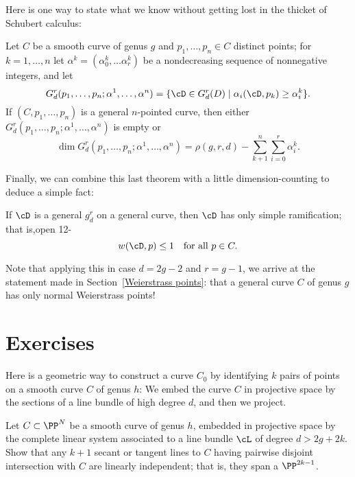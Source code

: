 Here is one way to state what we know without getting lost in the thicket of Schubert calculus:

\begin{theorem}\label{BN with inflection and dimension}
Let $C$ be a smooth curve of genus $g$ and $p_1,\dots,p_n \in C$ distinct points; for $k = 1,\dots,n$ let $\alpha^k = (\alpha^k_0,\dots\alpha^k_r)$ be a nondecreasing sequence of nonnegative integers, and let
$$
G^r_d(p_1,\dots,p_n; \alpha^1,\dots,\alpha^n) = \{\cD \in G^r_d(D) \mid \alpha_i(\cD, p_k) \geq \alpha^k_i \}.
$$
If $(C, p_1,\dots,p_n)$ is a general $n$-pointed curve, then either $G^r_d(p_1,\dots,p_n; \alpha^1,\dots,\alpha^n)$ is empty or
$$
\dim G^r_d(p_1,\dots,p_n; \alpha^1,\dots,\alpha^n) = \rho(g,r,d) - \sum_{k+1}^n \sum_{i=0}^r \alpha^k_i.
$$
\end{theorem}

Finally, we can combine this last theorem with a little dimension-counting to deduce a simple fact:

\begin{theorem}
If $\cD$ is a general $g^r_d$ on a general curve, then $\cD$ has only simple ramification; that is,open 12-	
$$
w(\cD, p) \leq 1 \quad \text{for all } p \in C.
$$
\end{theorem}

Note that applying this in case $d=2g-2$ and $r = g-1$, we arrive at the statement made in Section~\ref{Weierstrass points}: that a general curve $C$ of genus $g$ has only normal Weierstrass points!

\section{Exercises}


Here is a geometric way to construct a curve $C_0$ by identifying $k$ pairs of points on a smooth curve $C$ of genus $h$: We embed the curve $C$ in projective space by the sections of a line bundle of high degree $d$, and then we project.

\begin{exercise}\label{independent secants} Let $C \subset \PP^N$ be a smooth curve of genus $h$, embedded in projective space by the complete linear system associated to a line bundle $\cL$ of degree $d > 2g + 2k$. Show that any $k+1$ secant or tangent lines to $C$  having pairwise disjoint intersection with $C$ are linearly independent; that is, they span a $\PP^{2k-1}$.
\end{exercise}

